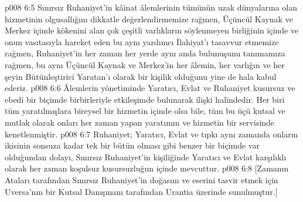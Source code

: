 \vs p008 6:5 Sınırsız Ruhaniyet’in kâinat âlemlerinin tümünün uzak dünyalarına olan hizmetinin olgusallığını dikkatle değerlendirmemize rağmen, Üçüncül Kaynak ve Merkez içinde kökenini alan çok çeşitli varlıkların söylenmeyen birliğinin içinde ve onun vasıtasıyla hareket eden bu aynı yardımcı İlahiyat’ı tasavvur etmemize rağmen, Ruhaniyet’in her zaman her yerde aynı anda bulunuşunu tanımamıza rağmen, bu aynı Üçüncül Kaynak ve Merkez’in her âlemin, her varlığın ve her şeyin Bütünleştirici Yaratan’ı olarak bir kişilik olduğunu yine de hala kabul ederiz.
\vs p008 6:6 Âlemlerin yönetiminde Yaratıcı, Evlat ve Ruhaniyet kusursuz ve ebedi bir biçimde birbirleriyle etkileşimde bulunarak ilişki halindedir. Her biri tüm yaratılmışlara bireysel bir hizmetin içinde olsa bile, tüm bu üçü kutsal ve mutlak olarak onları her zaman yapan yaratımın ve hizmetin bir servisinde kenetlenmiştir.
\vs p008 6:7 Ruhaniyet; Yaratıcı, Evlat ve tıpkı aynı zamanda onların ikisinin sonsuza kadar tek bir bütün olması gibi benzer bir biçimde var olduğundan dolayı, Sınırsız Ruhaniyet’in kişiliğinde Yaratıcı ve Evlat karşılıklı olarak her zaman koşulsuz kusursuzluğun içinde mevcuttur.
\vs p008 6:8 [Zamanın Ataları tarafından Sınırsız Ruhaniyet’in doğasını ve eserini tasvir etmek için Uversa’nın bir Kutsal Danışmanı tarafından Urantia üzerinde sunulmuştur.]
